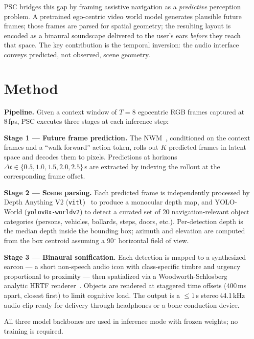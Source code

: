 \documentclass[letterpaper, 10pt, conference]{ieeeconf}
\begin{document}
PSC bridges this gap by framing assistive navigation as a
\emph{predictive} perception problem.  A pretrained ego-centric video
world model generates plausible future frames; those frames are parsed
for spatial geometry; the resulting layout is encoded as a binaural
soundscape delivered to the user's ears \emph{before} they reach that
space.  The key contribution is the temporal inversion: the audio
interface conveys predicted, not observed, scene geometry.

\section{Method}

\textbf{Pipeline.}
Given a context window of $T{=}8$ egocentric RGB frames captured at
8\,fps, PSC executes three stages at each inference step:

\textbf{Stage 1 — Future frame prediction.}
The NWM~\cite{bar2025nwm}, conditioned on the context frames and a
``walk forward'' action token, rolls out $K$ predicted frames in latent
space and decodes them to pixels.  Predictions at horizons
$\Delta t \in \{0.5, 1.0, 1.5, 2.0, 2.5\}$\,s are extracted by
indexing the rollout at the corresponding frame offset.

\textbf{Stage 2 — Scene parsing.}
Each predicted frame is independently processed by
Depth Anything V2 (\texttt{vitl})~\cite{yang2024depth} to produce a
monocular depth map, and YOLO-World (\texttt{yolov8x-worldv2})
\cite{cheng2024yolo} to detect a curated set of 20 navigation-relevant
object categories (persons, vehicles, bollards, steps, doors, etc.).
Per-detection depth is the median depth inside the bounding box;
azimuth and elevation are computed from the box centroid assuming a
90$^\circ$ horizontal field of view.

\textbf{Stage 3 — Binaural sonification.}
Each detection is mapped to a synthesized earcon — a short non-speech
audio icon with class-specific timbre and urgency proportional to
proximity — then spatialized via a Woodworth-Schlosberg analytic HRTF
renderer~\cite{woodworth1962}.  Objects are rendered at staggered time
offsets (400\,ms apart, closest first) to limit cognitive load.
The output is a $\leq\!1$\,s stereo\,44.1\,kHz audio clip ready for
delivery through headphones or a bone-conduction device.

All three model backbones are used in inference mode with frozen weights;
no training is required.
\end{document}

